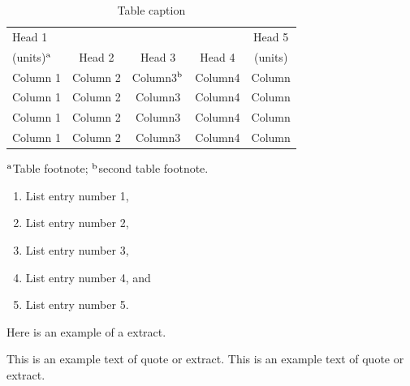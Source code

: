 \documentclass[a4paper]{ar-1col}
\begin{document}
\begin{table}[h]
\caption{Table caption}
\label{tab1}
\begin{center}
\begin{tabular}{@{}l|c|c|c|c@{}}
\hline
Head 1 &&&&Head 5\\
{(}units)$^{\rm a}$ &Head 2 &Head 3 &Head 4 &{(}units)\\
\hline
Column 1 &Column 2 &Column3$^{\rm b}$ &Column4 &Column\\
Column 1 &Column 2 &Column3 &Column4 &Column\\
Column 1 &Column 2 &Column3 &Column4 &Column\\
Column 1 &Column 2 &Column3 &Column4 &Column\\
\hline
\end{tabular}
\end{center}
\begin{tabnote}
$^{\rm a}$Table footnote; $^{\rm b}$second table footnote.
\end{tabnote}
\end{table}

\begin{enumerate}
\item List entry number 1,
\item List entry number 2,
\item List entry number 3,\item List entry number 4, and
\item List entry number 5.
\end{enumerate}

Here is an example of a extract.
\begin{extract}
This is an example text of quote or extract.
This is an example text of quote or extract.
\end{extract}

\begin{marginnote}[]
\end{marginnote}
\end{document}
